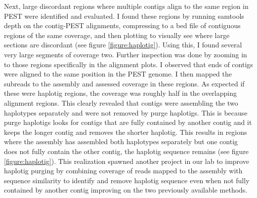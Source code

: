 \par{
Next, large discordant regions where multiple contigs align to the same region in PEST were identified and evaluated. I found these regions by running samtools depth on the contig-PEST alignments, compressing to a bed file of contiguous regions of the same coverage, and then plotting to visually see where large sections are discordant (see figure \ref{figure:haplotig}). Using this, I found several very large segments of coverage two. Further inspection was done by zooming in to those regions specifically in the alignment plots. I observed that ends of contigs were aligned to the same position in the PEST genome. I then mapped the subreads to the assembly and assessed coverage in these regions. As expected if these were haplotig regions, the coverage was roughly half in the overlapping alignment regions. This clearly revealed that contigs were assembling the two haplotypes separately and were not removed by purge haplotigs. This is because purge haplotigs looks for contigs that are fully contained by another contig and it keeps the longer contig and removes the shorter haplotig. This results in regions where the assembly has assembled both haplotypes separately but one contig does not fully contain the other contig, the haplotig sequence remains (see figure \ref{figure:haplotig}). This realization spawned another project in our lab to improve haplotig purging by combining coverage of reads mapped to the assembly with sequence similarity to identify and remove haplotig sequence even when not fully contained by another contig\cite{purgedups} improving on the two previously available methods\cite{purge}\cite{haplomerger}.
}


